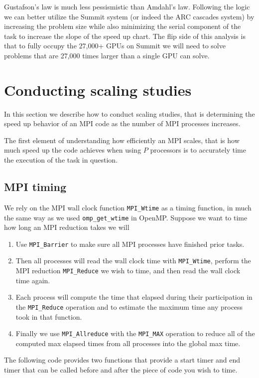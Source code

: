 Gustafson's law is much less pessismistic than Amdahl's law. Following the logic we can better utilize the Summit system (or indeed the ARC cascades system) by increasing the problem size while also minimizing the serial component of the task to increase the slope of the speed up chart. The flip side of this analysis is that to fully occupy the 27,000+ GPUs on Summit we will need to solve problems that are 27,000 times larger than a single GPU can solve. 

\section{Conducting scaling studies}

In this section we describe how to conduct scaling studies, that is determining the speed up behavior of an MPI code as the number of MPI processes increases.

The first element of understanding how efficiently an MPI scales, that is how much speed up the code achieves when using $P$ processors is to accurately time the execution of the task in question. 

\subsection{MPI timing}

We rely on the MPI wall clock function \texttt{MPI\_Wtime} as a timing function, in much the same way as we used \texttt{omp\_get\_wtime} in OpenMP. Suppose we want to time how long an MPI reduction takes we will 
\begin{enumerate}
  \item Use \texttt{MPI\_Barrier} to make sure all MPI processes have finished prior tasks. 
  \item Then all processes will read the wall clock time with \texttt{MPI\_Wtime}, perform the MPI reduction \texttt{MPI\_Reduce} we wish to time, and then read the wall clock time again. 
  \item Each process will compute the time that elapsed during their participation in the \texttt{MPI\_Reduce} operation and to estimate the maximum time any process took in that function.
  \item Finally we use \texttt{MPI\_Allreduce} with the \texttt{MPI\_MAX} operation to reduce all of the computed max elapsed times from all processes into the global max time.
\end{enumerate} 

The following code provides two functions that provide a start timer and end timer that can be called before and after the piece of code you wish to time.

